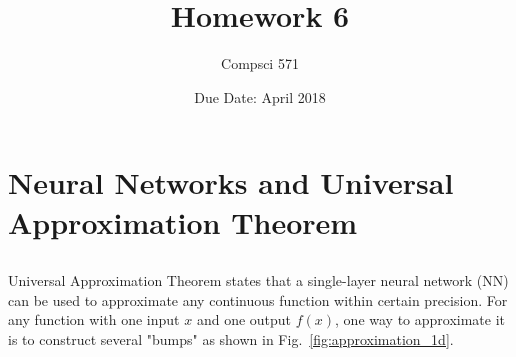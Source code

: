 \documentclass{article}
\title{Homework 6}
\author{Compsci 571}
\date{Due Date: April 2018}
\begin{document}
\maketitle

\section{Neural Networks and Universal Approximation Theorem}
\subsection{}
Universal Approximation Theorem states that a single-layer neural network (NN) can be used to approximate any continuous function within certain precision. For any function with one input $x$ and one output $f(x)$, one way to approximate it is to construct several "bumps" as shown in Fig.~\ref{fig:approximation_1d}.
\end{document}

